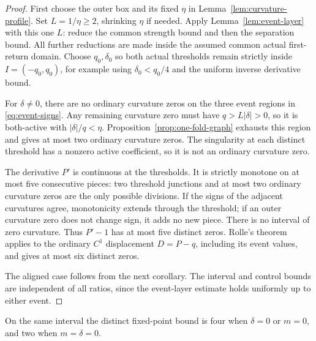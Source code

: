 \begin{proof}
First choose the outer box and its fixed \(\eta\) in
Lemma~\ref{lem:curvature-profile}. Set \(L=1/\eta\ge2\), shrinking
\(\eta\) if needed. Apply Lemma~\ref{lem:event-layer} with this one
\(L\): reduce the common strength bound and then the separation bound.
All further reductions are made inside the assumed common actual
first-return domain. Choose \(q_0,\delta_0\) so both actual thresholds remain
strictly inside \(I=(-q_0,q_0)\), for example using
\(\delta_0<q_0/4\) and the uniform inverse derivative bound.

For \(\delta\ne0\), there are no ordinary curvature zeros on the
three event regions in \eqref{eq:event-signs}. Any remaining curvature
zero must have \(q>L|\delta|>0\), so it is both-active with
\(|\delta|/q<\eta\). Proposition~\ref{prop:one-fold-graph} exhausts
this region and gives at most two ordinary curvature zeros.
The singularity at each distinct threshold has a nonzero active
coefficient, so it is not an ordinary curvature zero.

The derivative \(P'\) is continuous at the thresholds.
It is strictly monotone on at most five consecutive pieces: two
threshold junctions and at most two ordinary curvature zeros
are the only possible divisions. If the signs of the adjacent
curvatures agree, monotonicity extends through the threshold;
if an outer curvature zero does not change sign, it adds no new
piece. There is no interval of zero curvature. Thus \(P'-1\)
has at most five distinct zeros. Rolle's theorem applies to the
ordinary \(C^1\) displacement \(D=P-q\), including its event values,
and gives at most six distinct zeros.

The aligned case follows from the next corollary. The interval and control
bounds are independent of all ratios, since the event-layer estimate holds
uniformly up to either event.
\end{proof}

\begin{corollary}\label{cor:four-slices}
On the same interval the distinct fixed-point bound is four when
\(\delta=0\) or \(m=0\), and two when \(m=\delta=0\).
\end{corollary}

